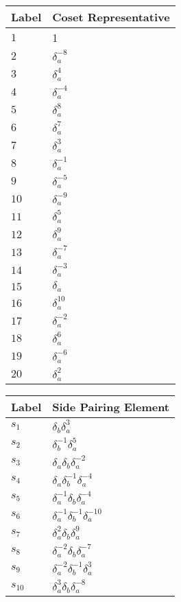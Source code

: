 \documentclass{article}
\begin{document}

\begin{center}
\begin{tabular}{ll}
\toprule
Label & Coset Representative\\
\midrule
$1$ & 1 \\
$2$ & $\delta_a^{-8}$ \\
$3$ & $\delta_a^{4}$ \\
$4$ & $\delta_a^{-4}$ \\
$5$ & $\delta_a^{8}$ \\
$6$ & $\delta_a^{7}$ \\
$7$ & $\delta_a^{3}$ \\
$8$ & $\delta_a^{-1}$ \\
$9$ & $\delta_a^{-5}$ \\
$10$ & $\delta_a^{-9}$ \\
$11$ & $\delta_a^{5}$ \\
$12$ & $\delta_a^{9}$ \\
$13$ & $\delta_a^{-7}$ \\
$14$ & $\delta_a^{-3}$ \\
$15$ & $\delta_a^{}$ \\
$16$ & $\delta_a^{10}$ \\
$17$ & $\delta_a^{-2}$ \\
$18$ & $\delta_a^{6}$ \\
$19$ & $\delta_a^{-6}$ \\
$20$ & $\delta_a^{2}$ \\
\bottomrule
\end{tabular}
\hfill
\begin{tabular}{ll}
\toprule
Label & Side Pairing Element\\
\midrule
$s_{1}$ & $\delta_b^{}\delta_a^{3}$ \\
$s_{2}$ & $\delta_b^{-1}\delta_a^{5}$ \\
$s_{3}$ & $\delta_a^{}\delta_b^{}\delta_a^{-2}$ \\
$s_{4}$ & $\delta_a^{}\delta_b^{-1}\delta_a^{-4}$ \\
$s_{5}$ & $\delta_a^{-1}\delta_b^{}\delta_a^{-4}$ \\
$s_{6}$ & $\delta_a^{-1}\delta_b^{-1}\delta_a^{-10}$ \\
$s_{7}$ & $\delta_a^{2}\delta_b^{}\delta_a^{9}$ \\
$s_{8}$ & $\delta_a^{-2}\delta_b^{}\delta_a^{-7}$ \\
$s_{9}$ & $\delta_a^{-2}\delta_b^{-1}\delta_a^{3}$ \\
$s_{10}$ & $\delta_a^{3}\delta_b^{}\delta_a^{-8}$ \\

\end{tabular}
\end{center}
\end{document}
